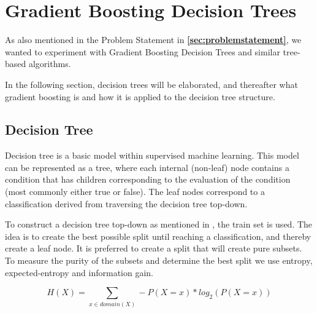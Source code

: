 \section{Gradient Boosting Decision Trees}
As also mentioned in the Problem Statement in \textbf{\autoref{sec:problemstatement}},
we wanted to experiment with Gradient Boosting Decision Trees and similar tree-based algorithms. %

In the following section, decision trees will be elaborated, and thereafter what gradient boosting is and how it is applied to the decision tree structure.


\subsection{Decision Tree}
Decision tree is a basic model within supervised machine learning. This model can be represented as a tree, where each internal (non-leaf) node contains a condition that has children corresponding to the evaluation of the condition (most commonly either true or false). The leaf nodes correspond to a classification derived from traversing the decision tree top-down.\cite{AIBook}

To construct a decision tree top-down as mentioned in \cite{AIBook}, the train set is used. The idea is to create the best possible split until reaching a classification, and thereby create a leaf node. It is preferred to create a split that will create pure subsets. To measure the purity of the subsets and determine the best split we use entropy, expected-entropy and information gain.

\begin{equation} \label{eq:entropy}
    H(X) = \sum_{x \in domain(X)} - P(X = x) * log_{2} (P(X = x))
\end{equation}

